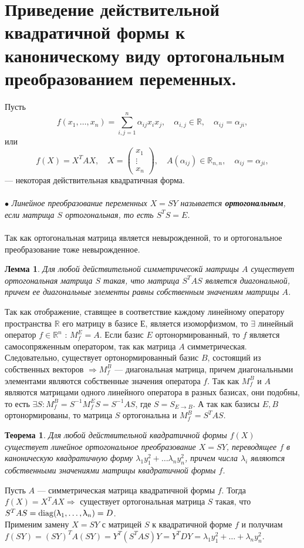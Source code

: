 \section{Приведение действительной квадратичной формы к каноническому виду ортогональным преобразованием переменных.}
Пусть $$f(x_1,\dots,x_n) = \sum_{i,j=1}^n\alpha_{ij}x_ix_j,\quad\alpha_{i,j}\in\mathbb{R},\quad\alpha_{ij}=\alpha_{ji},$$
или $$f(X) = X^T A X,\quad X=\begin{pmatrix}x_1\\ \vdots \\ x_n\end{pmatrix},\quad A(\alpha_{ij})\in\mathbb{R}_{n,n},\quad\alpha_{ij}=\alpha_{ji},$$ --- некоторая действительная квадратичная форма.\\\\
$\bullet$ \textit{Линейное преобразование переменных $X=SY$ называется \textit{\textbf{ортогональным}}, если матрица $S$ ортогональная, то есть $S^TS = E$.}\\\\
Так как ортогональная матрица является невырожденной, то и ортогональное преобразование тоже невырожденное.
\newtheorem*{lem14_7}{Лемма}\begin{lem14_7}
	Для любой действительной симметричесокй матрицы $A$ существует ортогональная матрица $S$ такая, что матрица $S^TAS$ является диагональной, причем ее диагональные элементы равны собственным значениям матрицы $A$.
\end{lem14_7}
\begin{Proof}
	Так как отображение, ставящее в соответствие каждому линейному оператору пространства $\mathbb{R}$ его матрицу в базисе $Е$, является изоморфизмом, то $\exists$ линейный оператор $f\in \mathbb{R}^n$ : $M_f^E = A$. Если базис $E$ ортонормированный, то $f$ является самосопряженным оператором, так как матрица $A$ симметрическая. Следовательно, существует ортонормированный базис $B$, состоящий из собственных векторов $\Rightarrow M_f^B$ --- диагональная матрица, причем диагональными элементами являются собственные значения оператора $f$. Так как $M_f^B$ и $A$ являются матрицами одного линейного оператора в разных базисах, они подобны, то есть $\exists S: M_f^B = S^{-1}M_f^E S=S^{-1}AS$, где $S = S_{E\rightarrow B}$. А так как базисы $E,B$ ортонормированы, то матрица $S$ ортогональна и $M_f^B = S^TAS$.
\end{Proof}
\newtheorem*{th14_7_1}{Теорема}\begin{th14_7_1}Для любой действительной квадратичной формы $f(X)$ существует линейное ортогональное преобразование $X=SY$, переводящее $f$ в каноническую квадратичную форму $\lambda_1y_1^2 + \dots \lambda_ny_n^2$, причем числа $\lambda_i$ являются собственными значениями матрицы квадратичной формы $f$.
\end{th14_7_1}\begin{Proof}
	Пусть $A$ --- симметрическая матрица квадратичной формы $f$. Тогда $f(X)=X^TAX \Rightarrow$ существует ортогональная матрица $S$ такая, что
	$S^TAS = \operatorname{diag} (\uplambda_1,\dots,\uplambda_n) = D$.\\ Применим замену $X = SY$ с матрицей $S$ к квадратичной форме $f$ и получиам $f(SY)=(SY)^TA(SY)=Y^T(S^TAS)Y=Y^TDY=\lambda_1y_1^2 + \ldots + \lambda_ny_n^2$.
\end{Proof}
